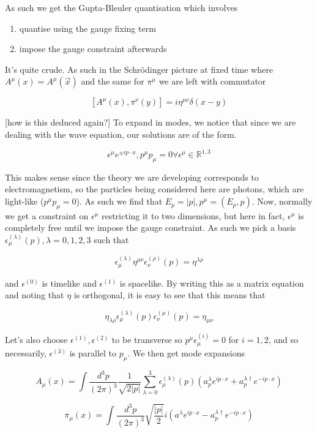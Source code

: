 \documentclass{article}
\theoremstyle{definition}
\begin{document}
As such we get the Gupta-Bleuler quantisation which involves

\begin{enumerate}
\item quantise using the gauge fixing term
\item impose the gauge constraint afterwards
\end{enumerate}

It's quite crude. As such in the Schr\"{o}dinger picture at fixed time where
$A^\mu(x) = A^\mu(\vec{x})$ and the same for $\pi^\mu$ we are left with
commutator

$$ [A^\mu(x), \pi^\nu(y)] = i\eta^{\mu \nu} \delta(x - y) $$

[how is this deduced again?] To expand in modes, we notice that since we are
dealing with the wave equation, our solutions are of the form.

$$ \epsilon^\mu e^{\pm i p \cdot x}, p^\mu p_\mu = 0 \forall \epsilon^\mu \in
\mathbb{R}^{1, 3} $$

This makes sense since the theory we are developing corresponds to
electromagnetism, so the particles being considered here are photons, which are
light-like ($p^\mu p_\mu = 0$). As such we find that $E_p = |p|, p^\mu = (E_p,
p)$. Now, normally we get a constraint on $\epsilon^\mu$ restricting it to two
dimensions, but here in fact, $\epsilon^\mu$ is completely free until we impose
the gauge constraint. As such we pick a basis $\epsilon_\mu^{(\lambda)}(p),
\lambda=0, 1, 2, 3$ such that

$$ \epsilon_\mu^{(\lambda)} \eta^{\mu \nu} \epsilon_\nu^{(\rho)} (p) =
\eta^{\lambda \rho} $$

and $\epsilon^{(0)}$ is timelike and $\epsilon^{(1)}$ is spacelike. By writing
this as a matrix equation and noting that $\eta$ is orthogonal, it is easy to see
that this means that

$$ \eta_{\lambda \rho} \epsilon^{(\lambda)}_\mu(p) \epsilon^{(\mu)}_\nu(p) =
\eta_{\mu \nu} $$

Let's also choose $\epsilon^{(1)}, \epsilon^{(2)}$ to be transverse so $p^\mu
\epsilon_\mu^{(i)} = 0$ for $i=1, 2$, and so necessarily, $\epsilon^(3)$ is
parallel to $p_\mu$. We then get mode expansions

$$ A_\mu(x) = \int \frac{d^3p}{(2\pi)^3} \frac{1}{\sqrt{2 |p|}} \sum_{\lambda =
  0}^3 \epsilon_\mu^{(\lambda)} (p) (a_p^\lambda e^{i p \cdot x} + a^{\lambda
  \dagger}_p e^{-ip \cdot x}) $$

$$ \pi_\mu(x) = \int \frac{d^3p}{(2\pi)^3} \sqrt{\frac{|p|}{2}} i \left(
  a^\lambda e^{ip \cdot x} - a^{\lambda \dagger}_p e^{-i p \cdot x} \right) $$
\end{document}
